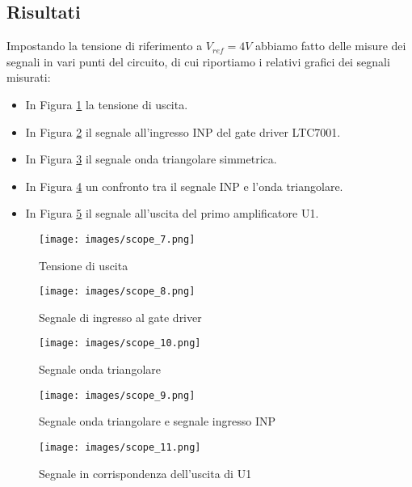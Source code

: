 \subsection{Risultati}
Impostando la tensione di riferimento a $V_{ref}=4V$ abbiamo fatto delle misure dei segnali in vari punti del circuito, di cui riportiamo i relativi grafici dei segnali misurati:
\begin{itemize}
    \item In Figura \ref{fig:OutVoltage2} la tensione di uscita.
    \item In Figura \ref{fig:GateDriverINP} il segnale all'ingresso INP del gate driver LTC7001.
    \item In Figura \ref{fig:SawtoothSignal} il segnale onda triangolare simmetrica. 
    \item In Figura \ref{fig:CompareSawtoothINP} un confronto tra il segnale INP e l'onda triangolare.
    \item In Figura \ref{fig:U1Output} il segnale all'uscita del primo amplificatore U1.
\end{itemize}
\begin{figure}[H]
    \centering
    \texttt{[image: images/scope\_7.png]}
    \caption{Tensione di uscita}
    \label{fig:OutVoltage2}
\end{figure}
\begin{figure}[H]
    \centering
    \texttt{[image: images/scope\_8.png]}
    \caption{Segnale di ingresso al gate driver}
    \label{fig:GateDriverINP}
\end{figure}
\begin{figure}[H]
    \centering
    \texttt{[image: images/scope\_10.png]}
    \caption{Segnale onda triangolare}
    \label{fig:SawtoothSignal}
\end{figure}
\begin{figure}[H]
    \centering
    \texttt{[image: images/scope\_9.png]}
    \caption{Segnale onda triangolare e segnale ingresso INP}
    \label{fig:CompareSawtoothINP}
\end{figure}
\begin{figure}[H]
    \centering
    \texttt{[image: images/scope\_11.png]}
    \caption{Segnale in corrispondenza dell'uscita di U1}
    \label{fig:U1Output}
\end{figure}
\clearpage
